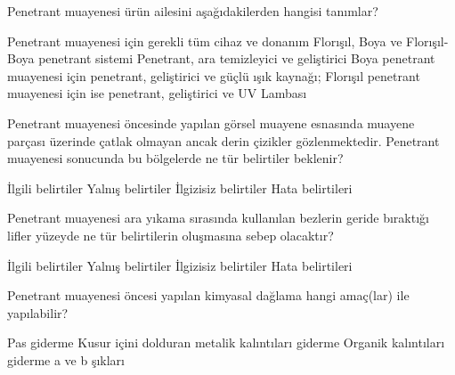 \begin{question}[subtitle=]
Penetrant muayenesi ürün ailesini aşağıdakilerden hangisi tanımlar?
	\begin{tasks}
          \task Penetrant muayenesi için gerekli tüm cihaz ve donanım
          \task Florışıl, Boya ve Florışıl-Boya penetrant sistemi
          \task Penetrant, ara temizleyici ve geliştirici \correct
          \task Boya penetrant muayenesi için penetrant, geliştirici ve güçlü ışık kaynağı; Florışıl penetrant muayenesi için ise penetrant, geliştirici ve UV Lambası
	\end{tasks}
\end{question}
\begin{solution}
	\correct
\end{solution}

\begin{question}[subtitle=]
  Penetrant muayenesi öncesinde yapılan görsel muayene esnasında muayene parçası
  üzerinde çatlak olmayan ancak derin çizikler gözlenmektedir. Penetrant muayenesi
  sonucunda bu bölgelerde ne tür belirtiler beklenir?
	\begin{tasks}
          \task İlgili belirtiler
          \task Yalnış belirtiler
          \task İlgizisiz belirtiler \correct
          \task Hata belirtileri
	\end{tasks}
\end{question}
\begin{solution}
	\correct
\end{solution}

\begin{question}[subtitle=]
  Penetrant muayenesi ara yıkama sırasında kullanılan bezlerin geride bıraktığı lifler
  yüzeyde ne tür belirtilerin oluşmasına sebep olacaktır?
	\begin{tasks}
          \task İlgili belirtiler
          \task Yalnış belirtiler \correct
          \task İlgizisiz belirtiler 
          \task Hata belirtileri
	\end{tasks}
\end{question}
\begin{solution}
	\correct
\end{solution}

\begin{question}[subtitle=]
  Penetrant muayenesi öncesi yapılan kimyasal dağlama hangi amaç(lar) ile yapılabilir?
	\begin{tasks}
          \task Pas giderme
          \task Kusur içini dolduran metalik kalıntıları giderme
          \task Organik kalıntıları giderme
          \task a ve b şıkları \correct
	\end{tasks}
\end{question}
\begin{solution}
	\correct
\end{solution}

